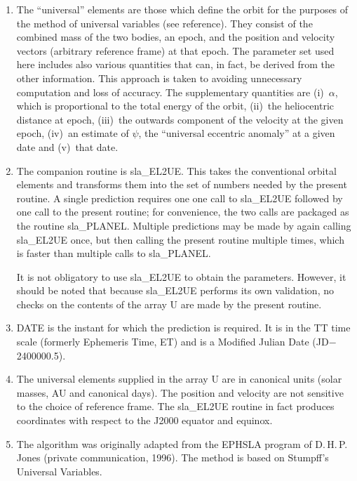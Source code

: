 \documentclass[11pt,twoside,nolof]{starlink}
\begin{document}
{
 \begin{enumerate}
  \setlength{\parskip}{\medskipamount}
  \item The ``universal'' elements are those which define the orbit for the
        purposes of the method of universal variables (see reference).
        They consist of the combined mass of the two bodies, an epoch,
        and the position and velocity vectors (arbitrary reference frame)
        at that epoch.  The parameter set used here includes also various
        quantities that can, in fact, be derived from the other
        information.  This approach is taken to avoiding unnecessary
        computation and loss of accuracy.  The supplementary quantities
        are (i)~$\alpha$, which is proportional to the total energy of the
        orbit, (ii)~the heliocentric distance at epoch,
        (iii)~the outwards component of the velocity at the given epoch,
        (iv)~an estimate of $\psi$, the ``universal eccentric anomaly'' at a
        given date and (v)~that date.
  \item The companion routine is sla\_EL2UE.  This takes the conventional
        orbital elements and transforms them into the set of numbers
        needed by the present routine.  A single prediction requires one
        one call to sla\_EL2UE followed by one call to the present routine;
        for convenience, the two calls are packaged as the routine
        sla\_PLANEL.  Multiple predictions may be made by again
        calling sla\_EL2UE once, but then calling the present routine
        multiple times, which is faster than multiple calls to sla\_PLANEL.

        It is not obligatory to use sla\_EL2UE to obtain the parameters.
        However, it should be noted that because sla\_EL2UE performs its
        own validation, no checks on the contents of the array U are made
        by the present routine.
  \item DATE is the instant for which the prediction is required.  It is
        in the TT time scale (formerly Ephemeris Time, ET) and is a
        Modified Julian Date (JD$-$2400000.5).
  \item The universal elements supplied in the array U are in canonical
        units (solar masses, AU and canonical days).  The position and
        velocity are not sensitive to the choice of reference frame.  The
        sla\_EL2UE routine in fact produces coordinates with respect to the
        J2000 equator and equinox.
  \item The algorithm was originally adapted from the EPHSLA program of
        D.\,H.\,P.\,Jones (private communication, 1996).  The method
        is based on Stumpff's Universal Variables.
 \end{enumerate}
}
\end{document}
